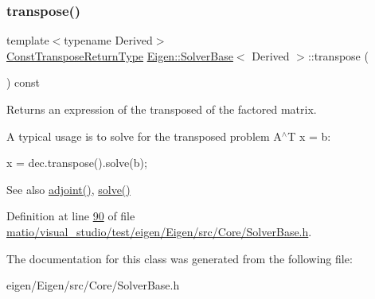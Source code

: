 \mbox{\label{class_eigen_1_1_solver_base_a732e75b5132bb4db3775916927b0e86c}} 
\subsubsection{\texorpdfstring{transpose()}{transpose()}\hspace{0.1cm}{\footnotesize\ttfamily [2/2]}}
{\footnotesize\ttfamily template$<$typename Derived$>$ \\
\hyperlink{group___core___module_class_eigen_1_1_transpose}{Const\+Transpose\+Return\+Type} \hyperlink{class_eigen_1_1_solver_base}{Eigen\+::\+Solver\+Base}$<$ Derived $>$\+::transpose (\begin{DoxyParamCaption}{ }\end{DoxyParamCaption}) const\hspace{0.3cm}{\ttfamily [inline]}}

\begin{DoxyReturn}{Returns}
an expression of the transposed of the factored matrix.
\end{DoxyReturn}
A typical usage is to solve for the transposed problem A$^\wedge$T x = b\+: 
\begin{DoxyCode}
x = dec.transpose().solve(b); 
\end{DoxyCode}


\begin{DoxySeeAlso}{See also}
\hyperlink{class_eigen_1_1_solver_base_a05a3686a89888681c8e0c2bcab6d1ce5}{adjoint()}, \hyperlink{class_eigen_1_1_solver_base_a7fd647d110487799205df6f99547879d}{solve()} 
\end{DoxySeeAlso}


Definition at line \hyperlink{matio_2visual__studio_2test_2eigen_2_eigen_2src_2_core_2_solver_base_8h_source_l00090}{90} of file \hyperlink{matio_2visual__studio_2test_2eigen_2_eigen_2src_2_core_2_solver_base_8h_source}{matio/visual\+\_\+studio/test/eigen/\+Eigen/src/\+Core/\+Solver\+Base.\+h}.



The documentation for this class was generated from the following file\+:\begin{DoxyCompactItemize}
\item 
eigen/\+Eigen/src/\+Core/\+Solver\+Base.\+h\end{DoxyCompactItemize}
